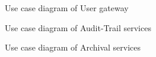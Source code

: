 \documentclass[12pt]{article}
\begin{document}
\begin{figure}[H]
\centering	
{}
\caption{Use case diagram of User gateway}
\end{figure}

\begin{figure}[H]
\centering	
{}
\caption{Use case diagram of Audit-Trail services}
\end{figure}

\begin{figure}[H]
\centering	
{}
\caption{Use case diagram of Archival services}
\end{figure}
\end{document}
